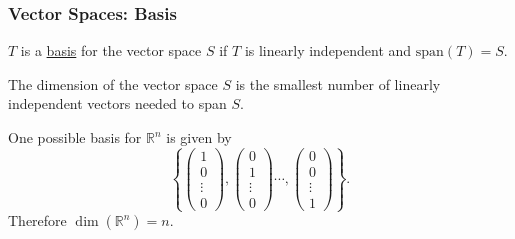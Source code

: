 \documentclass{beamer}
\begin{document}
\begin{frame}\frametitle{Vector Spaces: Basis}

\begin{definition}[Basis] $T$ is a \underline{basis} for the vector space $S$ if $T$ is linearly independent and $\mathrm{span}(T)=S$.	
\end{definition}

\begin{definition}[Dimension] The dimension of the vector space $S$ is the smallest number of linearly independent vectors needed to span $S$.	
\end{definition}

\begin{example}
One possible basis for $\mathbb{R}^n$ is given by
\[
\left\{\left(\begin{array}{c}1\\0\\\vdots\\0\end{array}\right),\left(\begin{array}{c}0\\1\\\vdots\\0\end{array}\right)\cdots,\left(\begin{array}{c}0\\0\\\vdots\\1\end{array}\right)\right\}.
\]
Therefore $\dim(\mathbb{R}^n) = n$.
\end{example}
\end{frame}
\end{document}
